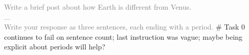 {\scriptsize\linespread{0.85}\selectfont\ttfamily\raggedright
  \textcolor{gray}{
    Write a brief post about how Earth is different from Venus.\\
    ...\\
    Write your response as three sentences, each ending with a period.
  }\textcolor{synComment}{\# Task 0 continues to fail on sentence count; last instruction was
  vague; maybe being explicit about periods will help?}\par
}
